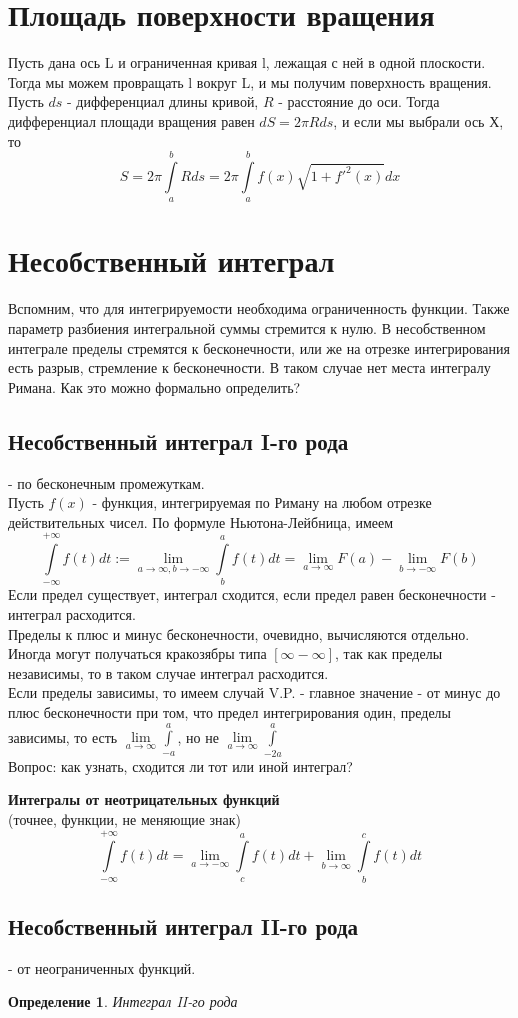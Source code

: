 \documentclass[a4paper]{article}
\newtheorem{defin}{Определение}
\begin{document}
\section{Площадь поверхности вращения}
Пусть дана ось L и ограниченная кривая l, лежащая с ней в одной плоскости.
Тогда мы можем провращать l вокруг L, и мы получим поверхность вращения. 
Пусть $ds$ - дифференциал длины кривой, $R$ - расстояние до оси. Тогда 
дифференциал площади вращения равен $dS=2\pi Rds$, и если мы выбрали ось Х, то
$$S=2\pi\int\limits^b_a Rds=2\pi\int\limits^b_af(x)\sqrt{1+f'^2(x)}dx$$



\section{Несобственный интеграл}
Вспомним, что для интегрируемости необходима ограниченность функции. Также 
параметр разбиения интегральной суммы стремится к нулю. В несобственном 
интеграле пределы стремятся к бесконечности, или же на отрезке интегрирования 
есть разрыв, стремление к бесконечности. В таком случае нет места интегралу
Римана. Как это можно формально определить?  
\subsection{Несобственный интеграл I-го рода}
- по бесконечным промежуткам. \\
Пусть $f(x)$ - функция, интегрируемая по Риману на любом отрезке
действительных чисел. По формуле Ньютона-Лейбница, имеем
$$\int\limits^{+\infty}_{-\infty}f(t)dt:=\lim_{a\to\infty,b\to-\infty}
\int\limits^a_bf(t)dt=\lim_{a\to\infty}F(a)-\lim_{b\to-\infty}F(b)$$
Если предел существует, интеграл сходится, если предел равен бесконечности -
интеграл расходится. \\
Пределы к плюс и минус бесконечности, очевидно, вычисляются отдельно. Иногда 
могут получаться кракозябры типа $[\infty-\infty]$, так как пределы независимы,
то в таком случае интеграл расходится.  \\
Если пределы зависимы, то имеем случай V.P. - главное значение - от минус до
плюс бесконечности при том, что предел интегрирования один, пределы зависимы,
то есть $\lim\limits_{a\to\infty}\int\limits_{-a}^{a}$, но не
$\lim\limits_{a\to\infty}\int\limits_{-2a}^{a}$\\
Вопрос: как узнать, сходится ли тот или иной интеграл?

\textbf{Интегралы от неотрицательных функций}\\
(точнее, функции, не меняющие знак)\\

$$\int\limits^{+\infty}_{-\infty}f(t)dt=\lim_{a\to-\infty}
\int\limits^a_cf(t)dt+\lim_{b\to\infty}\int\limits^c_bf(t)dt$$



\subsection{Несобственный интеграл II-го рода} 
- от неограниченных функций. 
\begin{defin}
Интеграл II-го рода
\end{defin}
\end{document}
